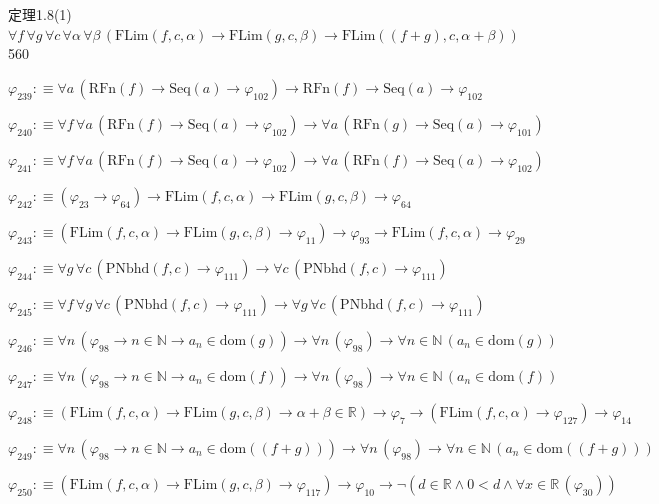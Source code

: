\begin{fullproof}{定理1.8(1)}{$\forall f\,\forall g\,\forall c\,\forall \alpha\,\forall \beta\,(\mathrm{FLim}(f,c,\alpha) \to \mathrm{FLim}(g,c,\beta) \to \mathrm{FLim}((f + g),c,\alpha + \beta))$}{560}
\begin{abbrevlist}
\item $\varphi_{239} :\equiv \forall a\,(\mathrm{RFn}(f) \to \mathrm{Seq}(a) \to \varphi_{102}) \to \mathrm{RFn}(f) \to \mathrm{Seq}(a) \to \varphi_{102}$
\item $\varphi_{240} :\equiv \forall f\,\forall a\,(\mathrm{RFn}(f) \to \mathrm{Seq}(a) \to \varphi_{102}) \to \forall a\,(\mathrm{RFn}(g) \to \mathrm{Seq}(a) \to \varphi_{101})$
\item $\varphi_{241} :\equiv \forall f\,\forall a\,(\mathrm{RFn}(f) \to \mathrm{Seq}(a) \to \varphi_{102}) \to \forall a\,(\mathrm{RFn}(f) \to \mathrm{Seq}(a) \to \varphi_{102})$
\item $\varphi_{242} :\equiv (\varphi_{23} \to \varphi_{64}) \to \mathrm{FLim}(f,c,\alpha) \to \mathrm{FLim}(g,c,\beta) \to \varphi_{64}$
\item $\varphi_{243} :\equiv (\mathrm{FLim}(f,c,\alpha) \to \mathrm{FLim}(g,c,\beta) \to \varphi_{11}) \to \varphi_{93} \to \mathrm{FLim}(f,c,\alpha) \to \varphi_{29}$
\item $\varphi_{244} :\equiv \forall g\,\forall c\,(\mathrm{PNbhd}(f,c) \to \varphi_{111}) \to \forall c\,(\mathrm{PNbhd}(f,c) \to \varphi_{111})$
\item $\varphi_{245} :\equiv \forall f\,\forall g\,\forall c\,(\mathrm{PNbhd}(f,c) \to \varphi_{111}) \to \forall g\,\forall c\,(\mathrm{PNbhd}(f,c) \to \varphi_{111})$
\item $\varphi_{246} :\equiv \forall n\,(\varphi_{98} \to n \in \mathbb{N} \to a_{n} \in \mathrm{dom}(g)) \to \forall n\,(\varphi_{98}) \to \forall n \in \mathbb{N}\,(a_{n} \in \mathrm{dom}(g))$
\item $\varphi_{247} :\equiv \forall n\,(\varphi_{98} \to n \in \mathbb{N} \to a_{n} \in \mathrm{dom}(f)) \to \forall n\,(\varphi_{98}) \to \forall n \in \mathbb{N}\,(a_{n} \in \mathrm{dom}(f))$
\item $\varphi_{248} :\equiv (\mathrm{FLim}(f,c,\alpha) \to \mathrm{FLim}(g,c,\beta) \to \alpha + \beta \in \mathbb{R}) \to \varphi_{7} \to (\mathrm{FLim}(f,c,\alpha) \to \varphi_{127}) \to \varphi_{14}$
\item $\varphi_{249} :\equiv \forall n\,(\varphi_{98} \to n \in \mathbb{N} \to a_{n} \in \mathrm{dom}((f + g))) \to \forall n\,(\varphi_{98}) \to \forall n \in \mathbb{N}\,(a_{n} \in \mathrm{dom}((f + g)))$
\item $\varphi_{250} :\equiv (\mathrm{FLim}(f,c,\alpha) \to \mathrm{FLim}(g,c,\beta) \to \varphi_{117}) \to \varphi_{10} \to \neg (d \in \mathbb{R} \land 0 < d \land \forall x \in \mathbb{R}\,(\varphi_{30}))$

\end{abbrevlist}
\end{fullproof}
